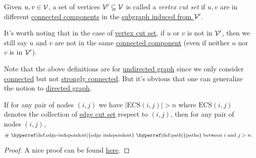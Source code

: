\begin{definition}\label{def:vertex-cut-set}
	Given \(u, v\in \mathcal{\MakeUppercase{v}} \), a set of vertices \(\mathcal{\MakeUppercase{v}} ^\prime \subseteq \mathcal{\MakeUppercase{v}}\) is called a \emph{vertex cut set}
	if \(u, v\) are in different \hyperref[def:connected]{connected components} in the \hyperref[def:induced-subgraph]{subgraph induced from \(\mathcal{\MakeUppercase{v}} ^\prime \)}.
\end{definition}

\begin{note}
	It's worth noting that in the case of \hyperref[def:vertex-cut-set]{vertex cut set}, if \(u\) or \(v\) is not in \(\mathcal{\MakeUppercase{v}} ^\prime\), then we still say
	\(u\) and \(v\) are not in the same \hyperref[def:connected]{connected component} (even if neither \(u\) nor \(v\) is in \(\mathcal{\MakeUppercase{v}} ^\prime \)).
\end{note}

\begin{remark}
	Note that the above definitions are for \hyperref[def:undirected-graph]{undirected graph} since we only consider \hyperref[def:connected]{connected} but not \hyperref[def:strongly-connected]{strongly connected}.
	But it's obvious that one can generalize the notion to \hyperref[def:directed-graph]{directed graph}.
\end{remark}


\begin{theorem}\label{thm:Mengur-theorem}
	If for any pair of nodes \((i, j)\) we have \(\left\vert \mathrm{ECS}(i, j) \right\vert > n\) where \(\mathrm{ECS} (i, j)\) denotes the collection of \hyperref[def:edge-cut-set]{edge cut set}
	respect to \((i, j)\), then for any pair of nodes \((i, j)\),
	\[
		\# \text{ \hyperref[def:edge-independent]{edge independent} \hyperref[def:path]{paths} between } i \text{ and } j > n.
	\]
\end{theorem}
\begin{proof}
	A nice proof can be found \href{https://en.wikipedia.org/wiki/Menger%27s_theorem}{here}.
\end{proof}